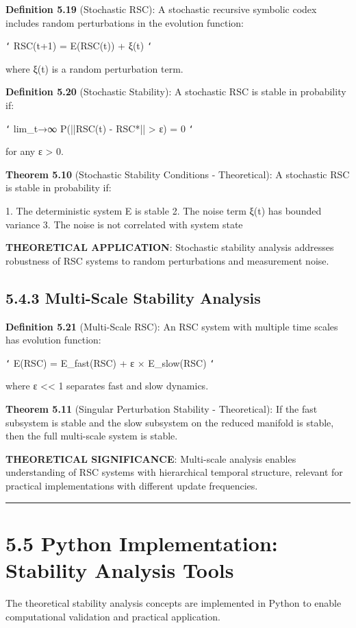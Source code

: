 \textbf{Definition 5.19} (Stochastic RSC): A stochastic recursive symbolic codex includes random perturbations in the evolution function:

\texttt{`}
RSC(t+1) = E(RSC(t)) + ξ(t)
\texttt{`}

where ξ(t) is a random perturbation term.

\textbf{Definition 5.20} (Stochastic Stability): A stochastic RSC is stable in probability if:

\texttt{`}
lim_{t→∞} P(||RSC(t) - RSC*|| > ε) = 0
\texttt{`}

for any ε > 0.

\textbf{Theorem 5.10} (Stochastic Stability Conditions - Theoretical): A stochastic RSC is stable in probability if:

1. The deterministic system E is stable
2. The noise term ξ(t) has bounded variance
3. The noise is not correlated with system state

\textbf{THEORETICAL APPLICATION}: Stochastic stability analysis addresses robustness of RSC systems to random perturbations and measurement noise.

\subsection{5.4.3 Multi-Scale Stability Analysis}

\textbf{Definition 5.21} (Multi-Scale RSC): An RSC system with multiple time scales has evolution function:

\texttt{`}
E(RSC) = E_fast(RSC) + ε × E_slow(RSC)
\texttt{`}

where ε << 1 separates fast and slow dynamics.

\textbf{Theorem 5.11} (Singular Perturbation Stability - Theoretical): If the fast subsystem is stable and the slow subsystem on the reduced manifold is stable, then the full multi-scale system is stable.

\textbf{THEORETICAL SIGNIFICANCE}: Multi-scale analysis enables understanding of RSC systems with hierarchical temporal structure, relevant for practical implementations with different update frequencies.

\hrule

\section{5.5 Python Implementation: Stability Analysis Tools}

The theoretical stability analysis concepts are implemented in Python to enable computational validation and practical application.

